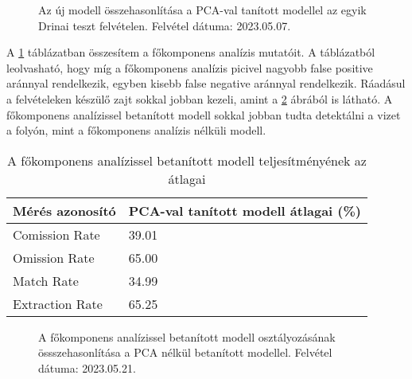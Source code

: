 \begin{figure}[H]
	\centering
	\hspace{5pt}
	\hspace{5pt}
	\caption{Az új modell összehasonlítása a PCA-val tanított modellel az egyik Drinai teszt felvételen. Felvétel dátuma: 2023.05.07.}
	\label{fig:pca-vs-no-pca}
\end{figure}

A \ref{tab:pca-vs-no-pca} táblázatban összesítem a főkomponens analízis mutatóit. A táblázatból leolvasható, hogy míg a főkomponens analízis picivel nagyobb false positive aránnyal rendelkezik, egyben kisebb false negative aránnyal rendelkezik. Ráadásul a felvételeken készülő zajt sokkal jobban kezeli, amint a \ref{fig:classification-pca-vs-no-pca} ábrából is látható. A főkomponens analízissel betanított modell sokkal jobban tudta detektálni a vizet a folyón, mint a főkomponens analízis nélküli modell.

\begin{table}[H]
	\centering
	\begin{tabular}{ | p{} | p{} | }
		\hline
		\textbf{Mérés azonosító} & \textbf{PCA-val tanított modell átlagai (\%)} \\
		\hline \hline
		Comission Rate & 39.01 \\
		\hline
		Omission Rate & 65.00 \\
		\hline
		Match Rate & 34.99  \\
		\hline
        Extraction Rate & 65.25 \\
		\hline
	\end{tabular}
	\caption{A főkomponens analízissel betanított modell teljesítményének az átlagai}
	\label{tab:pca-vs-no-pca}
\end{table}

\begin{figure}[H]
	\centering
	\hspace{5pt}
	\hspace{5pt}
	\caption{A főkomponens analízissel betanított modell osztályozásának össszehasonlítása a PCA nélkül betanított modellel. Felvétel dátuma: 2023.05.21.}
	\label{fig:classification-pca-vs-no-pca}
\end{figure}

